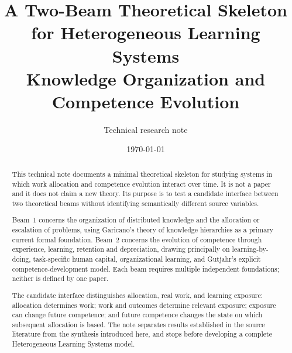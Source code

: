 \documentclass[11pt,a4paper]{article}
\title{A Two-Beam Theoretical Skeleton for Heterogeneous Learning Systems\\
\large Knowledge Organization and Competence Evolution}
\author{Technical research note}
\date{\today}
\begin{document}
\maketitle

\begin{abstract}
This technical note documents a minimal theoretical skeleton for studying systems in which
work allocation and competence evolution interact over time. It is not a paper and it does
not claim a new theory. Its purpose is to test a candidate interface between two theoretical
beams without identifying semantically different source variables.

Beam~1 concerns the organization of distributed knowledge and the allocation or escalation
of problems, using Garicano's theory of knowledge hierarchies as a primary current formal
foundation. Beam~2 concerns the evolution of competence through experience, learning,
retention and depreciation, drawing principally on learning-by-doing, task-specific human
capital, organizational learning, and Gutjahr's explicit competence-development model. Each
beam requires multiple independent foundations; neither is defined by one paper.

The candidate interface distinguishes allocation, real work, and learning exposure:
allocation determines work; work and outcomes determine relevant exposure; exposure can
change future competence;
and future competence changes the state on which subsequent allocation is based. The note
separates results established in the source literature from the synthesis introduced here,
and stops before developing a complete Heterogeneous Learning Systems model.
\end{abstract}













\end{document}
